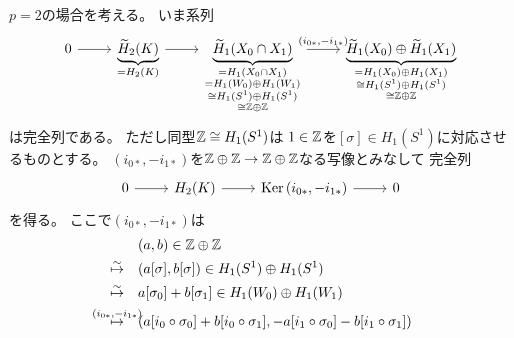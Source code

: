 \documentclass[report]{jlreq}
\begin{document}
\begin{answer}
    $p = 2$の場合を考える。
    いま系列
    \begin{equation}
        \begin{tikzcd}
            0 \ar{r}
                & \underbrace{\widetilde{H}_2(K)}_{= H_2(K)} \ar{r}
                & \underbrace{\widetilde{H}_1(X_0 \cap X_1)}_{
                    \substack{
                        = H_1(X_0 \cap X_1) \\
                        = H_1(W_0) \oplus H_1(W_1) \\
                        \cong H_1(S^1) \oplus H_1(S^1) \\
                        \cong \Z \oplus \Z
                    }
                } \ar{r}{(i_{0*}, -i_{1*})}
                & \underbrace{\widetilde{H}_1(X_0) \oplus \widetilde{H}_1(X_1)}_{
                    \substack{
                        = H_1(X_0) \oplus H_1(X_1) \\
                        \cong H_1(S^1) \oplus H_1(S^1) \\
                        \cong \Z \oplus \Z
                    }
                }
        \end{tikzcd}
    \end{equation}
    は完全列である。
    ただし同型$\mathbb{Z} \cong H_1(S^1)$は
    $1 \in \mathbb{Z}$を$[\sigma] \in H_1(S^1)$に対応させるものとする。
    $(i_{0*}, -i_{1*})$を$\mathbb{Z} \oplus \mathbb{Z} \to \mathbb{Z} \oplus \mathbb{Z}$なる写像とみなして
    完全列
    \begin{equation}
        \begin{tikzcd}
            0 \ar{r}
                & H_2(K) \ar{r}
                & \Ker \, (i_{0*}, -i_{1*}) \ar{r}
                & 0
        \end{tikzcd}
    \end{equation}
    を得る。
    ここで$(i_{0*}, -i_{1*})$は
    \begin{alignat}{1}
        \phantom{\mapsto}
            &\quad
            (a, b) \in \Z \oplus \Z \\
        \overset{\sim}{\mapsto}
            &\quad
            (a[\sigma], b[\sigma]) \in H_1(S^1) \oplus H_1(S^1) \\
        \overset{\sim}{\mapsto}
            &\quad
            a[\sigma_0] + b[\sigma_1] \in H_1(W_0) \oplus H_1(W_1) \\
        \overset{\mathclap{(i_{0*}, -i_{1*})}}{\mapsto}
            &\quad
            (
                a[i_0 \circ \sigma_0] + b[i_0 \circ \sigma_1],
                - a[i_1 \circ \sigma_0] - b[i_1 \circ \sigma_1]
            ) \\

\end{alignat}
\end{answer}
\end{document}

